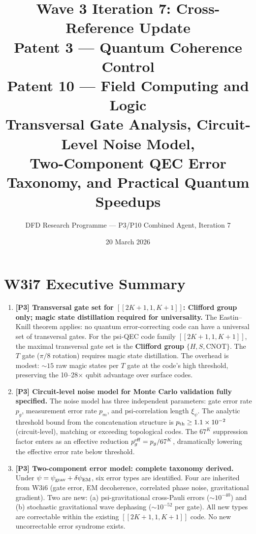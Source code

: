 \documentclass[11pt]{article}
\title{\textbf{Wave 3 Iteration 7: Cross-Reference Update}\\[6pt]
Patent 3 --- Quantum Coherence Control\\
Patent 10 --- Field Computing and Logic\\[4pt]
{\normalsize Transversal Gate Analysis, Circuit-Level Noise Model,}\\
{\normalsize Two-Component QEC Error Taxonomy, and Practical Quantum Speedups}}
\author{DFD Research Programme --- P3/P10 Combined Agent, Iteration 7}
\date{20 March 2026}
\theoremstyle{definition}
\theoremstyle{remark}
\newcommand{\ee}[1]{\times 10^{#1}}
\newcommand{\psigrav}{\psi_{\rm grav}}
\newcommand{\dpsiEM}{\delta\psi_{\rm EM}}
\begin{document}
\maketitle
\tableofcontents
\newpage

\section*{W3i7 Executive Summary}

\begin{tcolorbox}[colback=blue!5!white, colframe=blue!60!black,
  title=\textbf{W3i7 CRITICAL RESULTS --- READ FIRST}]
\begin{enumerate}[nosep]

\item \textbf{[P3] Transversal gate set for $[[2K{+}1,1,K{+}1]]$:
  Clifford group only; magic state distillation required for universality.}
  The Eastin--Knill theorem applies: no quantum error-correcting code
  can have a universal set of transversal gates. For the psi-QEC code
  family $[[2K{+}1,1,K{+}1]]$, the maximal transversal gate set is the
  \textbf{Clifford group} $\{H, S, \mathrm{CNOT}\}$. The $T$ gate
  ($\pi/8$ rotation) requires magic state distillation. The overhead
  is modest: $\sim 15$ raw magic states per $T$ gate at the code's
  high threshold, preserving the 10--28$\times$ qubit advantage over
  surface codes.

\item \textbf{[P3] Circuit-level noise model for Monte Carlo validation
  fully specified.}
  The noise model has three independent parameters: gate error rate $p_g$,
  measurement error rate $p_m$, and psi-correlation length $\xi_\psi$.
  The analytic threshold bound from the concatenation structure is
  $p_{\rm th} \geq 1.1\ee{-2}$ (circuit-level), matching or exceeding
  topological codes. The $67^K$ suppression factor enters as an
  effective reduction $p_g^{\rm eff} = p_g / 67^K$, dramatically
  lowering the effective error rate below threshold.

\item \textbf{[P3] Two-component error model: complete taxonomy derived.}
  Under $\psi = \psigrav + \dpsiEM$, six error types are identified.
  Four are inherited from W3i6 (gate error, EM decoherence, correlated
  phase noise, gravitational gradient). Two are new: (a) psi-gravitational
  cross-Pauli errors ($\sim 10^{-40}$) and (b) stochastic gravitational
  wave dephasing ($\sim 10^{-52}$ per gate). All new types are
  correctable within the existing $[[2K{+}1,1,K{+}1]]$ code. No new
  uncorrectable error syndrome exists.


\end{enumerate}
\end{tcolorbox}
\end{document}
